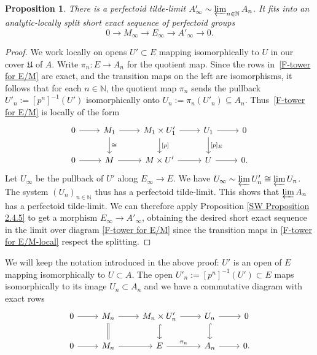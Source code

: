 \documentclass[10pt,oneside]{amsart}
\newtheorem{proposition}[theorem]{Proposition}
\theoremstyle{definition}
\newcommand{\N}{\mathbb{N}}
\begin{document}
		\begin{proposition}\label{M_infty->E_infty->A'_infty}
			There is a perfectoid tilde-limit $A'_\infty\sim \varprojlim_{n\in\N} A_n$. It fits into an analytic-locally split short exact sequence of perfectoid groups 
			\[0\to M_\infty\to E_\infty\to A'_\infty\to 0.\]
		\end{proposition}
		\begin{proof}
			We work locally on opens $U'\subset E$ mapping isomorphically to $U$ in our cover $\mathfrak U$ of $A$. Write $\pi_n\colon E\to A_n$ for the quotient map. Since the rows in~\eqref{F-tower for E/M} are exact, and the transition maps on the left are isomorphisms, it follows that for each $n\in \mathbb{N}$, the quotient map $\pi_n$  sends the pullback $U'_n:=[p^n]^{-1}(U')$ isomorphically onto $U_n:=\pi_n(U'_n)\subseteq A_n$. Thus~\eqref{F-tower for E/M} is locally of the form
				\begin{equation}\label{F-tower for E/M-local}
				\begin{tikzcd}
				0 \arrow[r] & M_1\arrow[d, "\cong"] \arrow[r] &  M_1\times U_1' \arrow[d, "{[p]}"] \arrow[r] &U_1 \arrow[d, "{[p]_E}"] \arrow[r] & 0 \\
				0 \arrow[r] & M \arrow[r] & M\times U' \arrow[r] & U \arrow[r] & 0.
				\end{tikzcd}
				\end{equation}
			Let $U_\infty$ be the pullback of $U'$ along $E_\infty\to E$. We have $U_\infty\sim \varprojlim U'_n\cong \varprojlim U_n$. The system $(U_n)_{n\in \mathbb{N}}$ thus has a perfectoid tilde-limit. This shows that $\varprojlim A_n$ has a perfectoid tilde-limit. We can therefore apply Proposition \ref{SW Proposition 2.4.5} to get a morphism $E_\infty\rightarrow A'_\infty$, obtaining the desired short exact sequence in the limit over diagram \eqref{F-tower for E/M} since the transition maps in \eqref{F-tower for E/M-local} respect the splitting. 
		\end{proof}
	
We will keep the notation introduced in the above proof: $U'$ is an open of $E$ mapping isomorphically to $U\subset A$. The open $U'_n:=[p^n]^{-1}(U')\subset E$ maps isomorphically to its image $U_n\subset A_n$ and we have a commutative diagram with exact rows
\[
 		\begin{tikzcd}
		0 \arrow[r] & M_n \arrow[d, equal] \arrow[r] & M_n\times U'_n \arrow[d,hook] \arrow[r] &  U_n\arrow[d, hook] \arrow[r] & 0 \\
		0 \arrow[r] & M_n \arrow[r] & E \arrow[r,"{\pi_n}"] & A_n \arrow[r] & 0.
		\end{tikzcd}
\]
	
\end{document}
